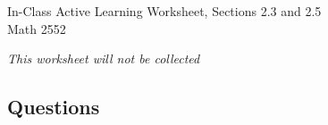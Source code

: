 \documentclass[12pt]{exam}
\newcommand{\TestName}{In-Class Active Learning Worksheet, Sections 2.3 and 2.5}
\begin{document}
    
\vspace*{-.5cm}

\newcommand{\Course}{Math 2552}

\begin{center}
{\Large \TestName 
\\[4pt]
\Course}
\end{center}

\begin{center}    
{\small
\textit{This worksheet will not be collected}
}
\end{center}

\vspace{-.5cm}

\subsection*{Questions}
\end{document}
